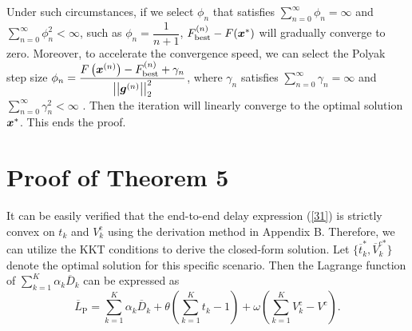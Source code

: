 \documentclass[journal,draftcls,onecolumn,12pt,twoside]{IEEEtran}
\newcommand{\bm}[1]{\mbox{\boldmath{$#1$}}}
\begin{document}
\begin{appendices}
Under such circumstances, if we select $\phi_n$ that satisfies $\sum_{n=0}^{\infty}\phi_n=\infty$ and $\sum_{n=0}^{\infty} \phi_n^2<\infty$, such as $\phi_n=\dfrac{1}{n+1}$, $F^{(n)}_{\text{best}}-F({\bm{x}}^*)$ will gradually converge to zero. Moreover, to accelerate the convergence speed, we can select the Polyak step size $\phi_n=\dfrac{F\left({\bm{x}}^{(n)}\right)-F^{(n)}_{\text{best}} + \gamma_n}{\left|\left|{\bm{g}}^{(n)}\right|\right|_2^2}$, where $\gamma_n$ satisfies $\sum_{n=0}^{\infty}\gamma_n=\infty$ and $\sum_{n=0}^{\infty}\gamma_n^2<\infty$ \cite{Convex_Optimization_II}. Then the iteration will linearly converge to the optimal solution $\bm{x}^*$. This ends the proof.

\section{Proof of Theorem 5}
It can be easily verified that the end-to-end delay expression (\ref{31}) is strictly convex on $t_k$ and $V_k^{\text{c}}$ using the derivation method in Appendix B. Therefore, we can utilize the KKT conditions to derive the closed-form solution. Let $\{\overline{t}_k^*, \overline{V}_k^{\text{c}*}\}$ denote the optimal solution for this specific scenario. Then the Lagrange function of $\sum_{k=1}^K \alpha_k \overline{D}_k$  can be expressed as
\begin{equation}
    \overline{L}_{\text{P}} = \sum_{k=1}^K \alpha_k \overline{D}_k + \theta \left(\sum_{k=1}^K t_k - 1\right) + \omega \left(\sum_{k=1}^K V_k^{\text{c}} - V^{\text{c}}\right). \label{47}
\end{equation}


\end{appendices}
\end{document}
